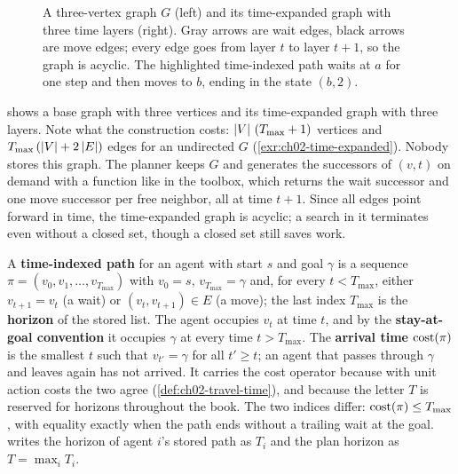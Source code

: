 \begin{figure}[tb]
  \centering
  \caption{A three-vertex graph $G$ (left) and its time-expanded graph with three time layers (right). Gray arrows are wait edges, black arrows are move edges; every edge goes from layer $t$ to layer $t+1$, so the graph is acyclic. The highlighted time-indexed path waits at $a$ for one step and then moves to $b$, ending in the state $(b,2)$.}
  \label{fig:ch02-time-expanded}
\end{figure}

 shows a base graph with three vertices and its time-expanded graph with three layers. Note what the construction costs: $\left\lvert V \right\rvert\,(T_{\max}+1)$ vertices and $T_{\max}\,(\left\lvert V \right\rvert+2\left\lvert E \right\rvert)$ edges for an undirected $G$ (\cref{exr:ch02-time-expanded}). Nobody stores this graph. The planner keeps $G$ and generates the successors of $(v,t)$ on demand with a function like  in the toolbox, which returns the wait successor and one move successor per free neighbor, all at time $t+1$. Since all edges point forward in time, the time-expanded graph is acyclic; a search in it terminates even without a closed set, though a closed set still saves work.

\begin{definition}
\label{def:ch02-time-indexed-path}
A \textbf{time-indexed path} for an agent with start $s$ and goal $\gamma$ is a sequence $\pi=(v_0,v_1,\dots,v_{T_{\max}})$ with $v_0=s$, $v_{T_{\max}}=\gamma$ and, for every $t<T_{\max}$, either $v_{t+1}=v_t$ (a wait) or $(v_t,v_{t+1})\in E$ (a move); the last index $T_{\max}$ is the \textbf{horizon} of the stored list. The agent occupies $v_t$ at time $t$, and by the \textbf{stay-at-goal convention} it occupies $\gamma$ at every time $t>T_{\max}$. The \textbf{arrival time} $\operatorname{cost}(\pi)$ is the smallest $t$ such that $v_{t'}=\gamma$ for all $t'\ge t$; an agent that passes through $\gamma$ and leaves again has not arrived. It carries the cost operator because with unit action costs the two agree (\cref{def:ch02-travel-time}), and because the letter $T$ is reserved for horizons throughout the book. The two indices differ: $\operatorname{cost}(\pi)\le T_{\max}$, with equality exactly when the path ends without a trailing wait at the goal.  writes the horizon of agent $i$'s stored path as $T_i$ and the plan horizon as $T=\max_i T_i$.
\end{definition}

